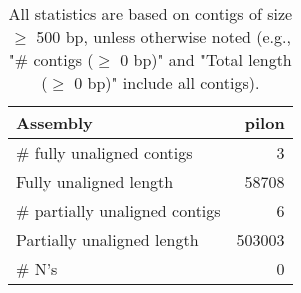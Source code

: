 \documentclass[12pt,a4paper]{article}
\begin{document}
\begin{table}[ht]
\begin{center}
\caption{All statistics are based on contigs of size $\geq$ 500 bp, unless otherwise noted (e.g., "\# contigs ($\geq$ 0 bp)" and "Total length ($\geq$ 0 bp)" include all contigs).}
\begin{tabular}{|l*{1}{|r}|}
\hline
Assembly & pilon \\ \hline
\# fully unaligned contigs & 3 \\ \hline
Fully unaligned length & 58708 \\ \hline
\# partially unaligned contigs & 6 \\ \hline
Partially unaligned length & 503003 \\ \hline
\# N's & 0 \\ \hline
\end{tabular}
\end{center}
\end{table}
\end{document}
